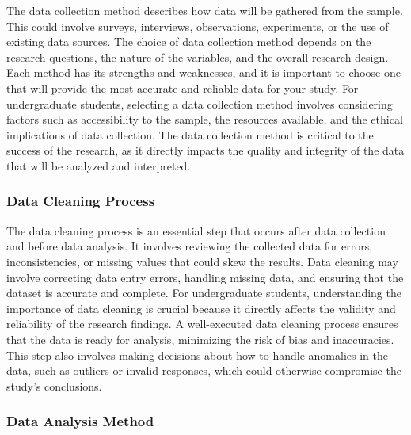 \documentclass[
]{book}
\begin{document}
The data collection method describes how data will be gathered from the sample. This could involve surveys, interviews, observations, experiments, or the use of existing data sources. The choice of data collection method depends on the research questions, the nature of the variables, and the overall research design. Each method has its strengths and weaknesses, and it is important to choose one that will provide the most accurate and reliable data for your study. For undergraduate students, selecting a data collection method involves considering factors such as accessibility to the sample, the resources available, and the ethical implications of data collection. The data collection method is critical to the success of the research, as it directly impacts the quality and integrity of the data that will be analyzed and interpreted.

\subsubsection*{Data Cleaning Process}\label{data-cleaning-process}

The data cleaning process is an essential step that occurs after data collection and before data analysis. It involves reviewing the collected data for errors, inconsistencies, or missing values that could skew the results. Data cleaning may involve correcting data entry errors, handling missing data, and ensuring that the dataset is accurate and complete. For undergraduate students, understanding the importance of data cleaning is crucial because it directly affects the validity and reliability of the research findings. A well-executed data cleaning process ensures that the data is ready for analysis, minimizing the risk of bias and inaccuracies. This step also involves making decisions about how to handle anomalies in the data, such as outliers or invalid responses, which could otherwise compromise the study's conclusions.

\subsubsection*{Data Analysis Method}\label{data-analysis-method}
\end{document}
